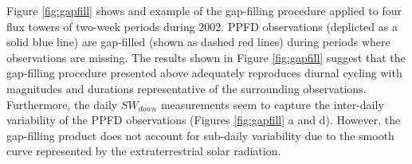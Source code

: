 Figure \ref{fig:gapfill} shows and example of the gap-filling procedure applied to four flux towers of two-week periods during 2002.  
PPFD observations (deplicted as a solid blue line) are gap-filled (shown as dashed red lines) during periods where observations are missing.  
The results shown in Figure \ref{fig:gapfill} suggest that the gap-filling procedure presented above adequately reproduces diurnal cycling with magnitudes and durations representative of the surrounding observations.  
Furthermore, the daily $SW_{down}$ measurements seem to capture the inter-daily variability of the PPFD observations (Figures \ref{fig:gapfill} a and d). 
However, the gap-filling product does not account for sub-daily variability due to the smooth curve represented by the extraterrestrial solar radiation.


